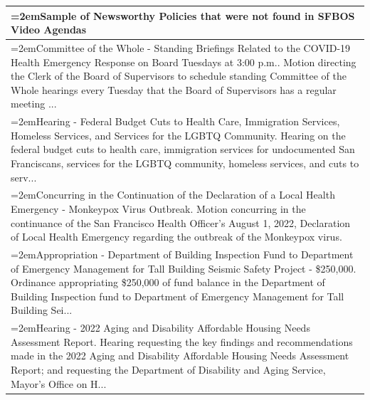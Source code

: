 \documentclass[11pt]{article}
\begin{document}
\begin{table}[t]
\begin{tabularx}{\linewidth}{>{\hangindent=2em}X}
\toprule
Sample of Newsworthy Policies that were not found in SFBOS Video Agendas \\
\midrule
Committee of the Whole - Standing Briefings Related to the COVID-19 Health Emergency Response on Board Tuesdays at 3:00 p.m.. Motion directing the Clerk of the Board of Supervisors to schedule standing Committee of the Whole hearings every Tuesday that the Board of Supervisors has a regular meeting ... \\
Hearing - Federal Budget Cuts to Health Care, Immigration Services, Homeless Services, and Services for the LGBTQ Community. Hearing on the federal budget cuts to health care, immigration services for undocumented San Franciscans, services for the LGBTQ community, homeless services, and cuts to serv... \\
 Concurring in the Continuation of the Declaration of a Local Health Emergency - Monkeypox Virus Outbreak. Motion concurring in the continuance of the San Francisco Health Officer's August 1, 2022, Declaration of Local Health Emergency regarding the outbreak of the Monkeypox virus. \\
Appropriation - Department of Building Inspection Fund to Department of Emergency Management for Tall Building Seismic Safety Project - \$250,000. Ordinance appropriating \$250,000 of fund balance in the Department of Building Inspection fund to Department of Emergency Management for Tall Building Sei... \\
Hearing - 2022 Aging and Disability Affordable Housing Needs Assessment Report. Hearing requesting the key findings and recommendations made in the 2022 Aging and Disability Affordable Housing Needs Assessment Report; and requesting the Department of Disability and Aging Service, Mayor's Office on H... \\

\end{tabularx}
\end{table}
\end{document}
